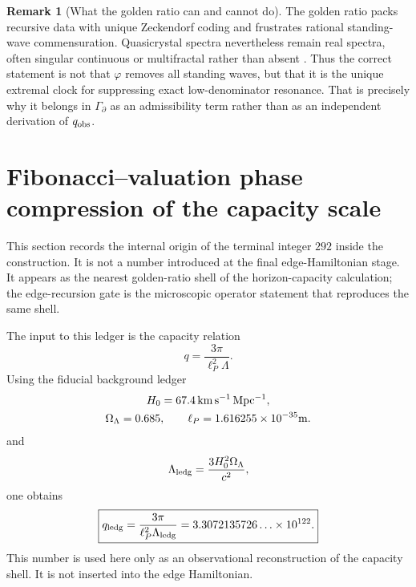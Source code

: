 \documentclass[aps,prd,reprint,nofootinbib,superscriptaddress,floatfix]{revtex4-2}
\numberwithin{equation}{section}
\theoremstyle{definition}
\newtheorem{remark}{Remark}[section]
\theoremstyle{plain}
\begin{document}
\begin{remark}[What the golden ratio can and cannot do]
The golden ratio packs recursive data with unique Zeckendorf coding and
frustrates rational standing-wave commensuration.  Quasicrystal spectra
nevertheless remain real spectra, often singular continuous or
multifractal rather than absent \cite{Senechal1995,Jagannathan2021}.
Thus the correct statement is not that \(\varphi\) removes all standing
waves, but that it is the unique extremal clock for suppressing exact
low-denominator resonance.  That is precisely why it belongs in
\(\Gamma_\partial\) as an admissibility term rather than as an independent
derivation of \(q_{\rm obs}\).
\end{remark}







\section{Fibonacci--valuation phase compression of the capacity scale}
\label{sec:fib-val-phase-compression}

This section records the internal origin of the terminal integer \(292\) inside the construction.  It is not a number introduced at the final edge-Hamiltonian stage.  It appears as the nearest golden-ratio shell of the horizon-capacity calculation; the edge-recursion gate is the microscopic operator statement that reproduces the same shell.

The input to this ledger is the capacity relation
\[
q=\frac{3\pi}{\ell_P^2\Lambda}.
\]
Using the fiducial background ledger
\[
\begin{gathered}
H_0=67.4\,{\rm km\,s^{-1}\,Mpc^{-1}},\\
\Omega_\Lambda=0.685,\qquad
\ell_P=1.616255\times10^{-35}{\rm m}.
\end{gathered}
\]
and
\[
\Lambda_{\rm ledg}=\frac{3H_0^2\Omega_\Lambda}{c^2},
\]
one obtains
\begin{equation}
\boxed{
q_{\rm ledg}
=
\frac{3\pi}{\ell_P^2\Lambda_{\rm ledg}}
=
3.3072135726\ldots\times10^{122}.
}
\label{eq:q-ledger}
\end{equation}
This number is used here only as an observational reconstruction of the capacity shell.  It is not inserted into the edge Hamiltonian.
\end{document}

